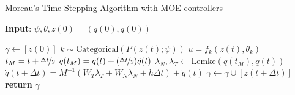 \begin{algorithm}
    \caption{Moreau's Time Stepping Algorithm with MOE controllers}
    \label{algo:moreau_moe}
    \small
    \hspace*{\algorithmicindent} \textbf{Input}: $\psi, \theta, z(0) = (q(0), \dot{q}(0))$
    \begin{algorithmic}[1]
      \State $\gamma \leftarrow  [z(0)]$ 
            \State $k \sim \text{Categorical}(P(z(t); \psi))$ 
            \State $u = f_k(z(t), \theta_k)$      
            \State $t_M = t + \nicefrac{\Delta t}{2}$
            \State $q(t_M) = q(t) +  (\nicefrac{\Delta t}{2}) \dot{q}(t) $
            \State $\lambda_N, \lambda_T \leftarrow \text{Lemke}(q(t_M), \dot{q}(t))$ 
            \State $\dot{q}(t+\Delta t) = M^{-1}(W_T \lambda_T + W_N \lambda_N + h\Delta t) + \dot{q}(t)$
            \State $\gamma \leftarrow \gamma \cup [z(t+\Delta t)]$
          \EndFor
        \State \textbf{return} $\gamma$
    \end{algorithmic}
\end{algorithm}

